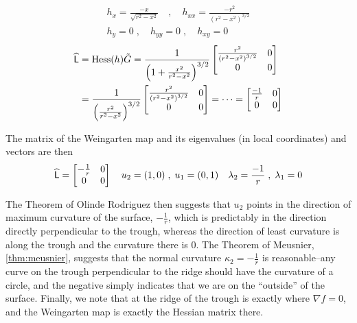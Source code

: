 \begin{gather*}
h_x = \frac{-x}{\sqrt{r^2 - x^2}}
\quad , \quad
h_{xx} = \frac{-r^2}{\left(r^2 - x^2\right)^{3/2}}\\
h_y = 0
\; , \quad
h_{yy} = 0 \;,\quad h_{xy} = 0
\end{gather*}
    \begin{align*}
  \widehat{\mathsf{L}} &= \mathrm{Hess}(h)\tilde{G}
  = \frac{1}{\left(1+\frac{x^2}{r^2-x^2}\right)^{3/2}}
  \begin{bmatrix} \frac{r^2}{\left(r^2 - x^2\right)^{3/2}} & 0 \\
  0 & 0 \end{bmatrix} \\
  &= \frac{1}{\left(\frac{r^2}{r^2-x^2}\right)^{3/2}}
  \begin{bmatrix} \frac{r^2}{\left(r^2 - x^2\right)^{3/2}} & 0 \\
  0 & 0 \end{bmatrix}
  = \cdots
  = \begin{bmatrix} \frac{-1}{r} & 0 \\ 0 & 0 \end{bmatrix}
  \end{align*}
  
The matrix of the Weingarten map and its eigenvalues (in local coordinates) and vectors are then
\begin{equation} \label{eq:trough-example-eigens}
  \widehat{\mathsf{L}} = \begin{bmatrix} - \frac{1}{r} & 0 \\ 0 & 0 	\end{bmatrix} \quad
  u_2 = (1,0) \;,\; u_1 = (0,1) \quad
  \lambda_2 = \frac{-1}{r} \;,\; \lambda_1 = 0
  \end{equation}

The Theorem of Olinde Rodriguez then suggests that $u_2$ points in the direction of maximum curvature of the surface, $-\frac{1}{r}$, which is predictably in the direction directly perpendicular to the trough, whereas the direction of least curvature is along the trough and the curvature there is $0$. The Theorem of Meusnier, \cref{thm:meusnier}, suggests that the normal curvature $\kappa_2 = -\frac{1}{r}$ is reasonable--any curve on the trough perpendicular to the ridge should have the curvature of a circle, and the negative simply indicates that we are on the ``outside'' of the surface. Finally, we note that at the ridge of the trough is exactly where $\nabla f = 0$, and the Weingarten map is exactly the Hessian matrix there.

